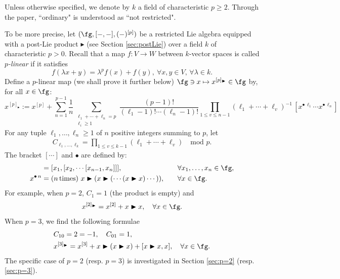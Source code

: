\documentclass[12pt]{article}
\newcommand{\btr}{\blacktriangleright}
\begin{document}
Unless otherwise specified, we denote by $k$ a field of characteristic $p\geq 2$. Through the paper, ``ordinary" is understood as ``not restricted".




To be more precise, let $(\fg, [-,-], (-)^{[p]})$ be a restricted Lie algebra equipped with a post-Lie product $\btr$ (see Section \ref{sec:postLie}) over a field $k$ of characteristic $p>0$. Recall that a map $f:V\rightarrow W$ between $k$-vector spaces is called \textit{$p$-linear} if it satisfies
\begin{equation}
    f(\lambda x+y)=\lambda^pf(x)+f(y),~\forall x,y\in V,\, \forall\lambda \in k.
\end{equation}
Define a $p$-linear map (we shall prove it further below) $\fg \ni x \mapsto x^{[p]_{\btr}}\in \fg$ by, for all $x\in \fg$:
\begin{equation}
\label{eqn:pstruct}
x^{[p]_{\btr}} := x^{[p]} +\sum_{n=1}^{p-1}\frac{1}{n}\sum_{\substack{\ell_1 + \cdots + \ell_{n} = p \\ \ell_i \geq 1}} \frac{(p-1)!}{(\ell_1-1)!\cdots (\ell_n-1)!}\prod_{1 \leq v \leq n-1} ( \ell_{1} + \cdots + \ell_v)^{-1}\,[x^{\bullet\,\ell_1} \cdots x^{\bullet\,\ell_{n}}]
\end{equation}
For any tuple $ \ell_1,\ldots,\ell_n \geq 1$ of $n$ positive integers summing to $p$, let
\begin{align}
\label{eqn:coeffc}
C_{\ell_1,\ldots,\ell_k}= \prod_{1 \leq v \leq k-1} ( \ell_{1} + \cdots + \ell_v) \quad \text{mod }p.
\end{align}
The bracket $[\cdots]$ and $\bullet$ are defined by:
\begin{align}
 [x_1,\ldots,x_n] &= [x_1,[x_2,\cdots [x_{n-1},x_n]]],\quad && \forall x_1,\ldots,x_n \in \fg, \\
 x^{\bullet\, n} &= (n{\rm \,times}) \,\, x \btr ( x \btr ( \cdots (x\btr x)\cdots)), \quad && \forall x \in \fg.
\end{align}
For example, when $p=2$, $C_{1} = 1$ (the product is empty) and 
\begin{equation}x^{[2]_{\btr}} = x^{[2]}+x\btr x,\quad \forall x \in \fg.\end{equation}
When $p=3$, we find the following formulae
\begin{align}
&C_{10} = 2 = -1,\quad C_{01} = 1, \\ 
& x^{[3]_{\btr}} = x^{[3]} + x\btr(x \btr x) + [x\btr x,x],\quad \forall x\in \fg.
\end{align}
The specific case of $p=2$ (resp. $p=3$) is investigated in Section \ref{sec:p=2} (resp. \ref{sec:p=3}).
\end{document}
